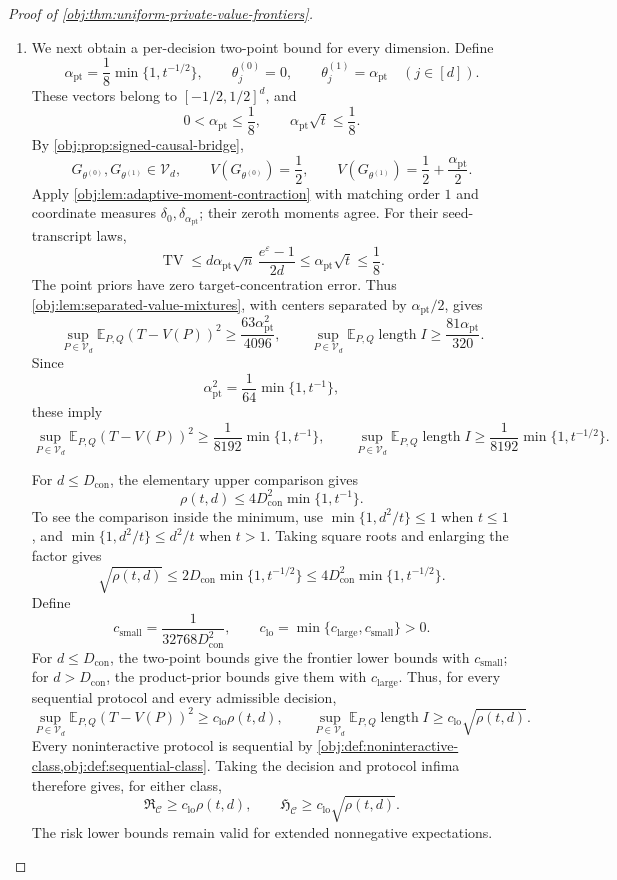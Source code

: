 \begin{proof}[Proof of \cref{obj:thm:uniform-private-value-frontiers}]
\begin{enumerate}
\item
We next obtain a per-decision two-point bound for every dimension. Define
\[
\alpha_{\mathrm{pt}}
=\frac18\min\{1,t^{-1/2}\},
\qquad
\theta^{(0)}_j=0,\qquad
\theta^{(1)}_j=\alpha_{\mathrm{pt}}
\quad(j\in[d]).
\]
These vectors belong to \([-1/2,1/2]^d\), and
\[
0<\alpha_{\mathrm{pt}}\le\frac18,\qquad
\alpha_{\mathrm{pt}}\sqrt t\le\frac18.
\]
By \cref{obj:prop:signed-causal-bridge},
\[
G_{\theta^{(0)}},G_{\theta^{(1)}}\in\mathcal V_d,
\qquad
V(G_{\theta^{(0)}})=\frac12,\qquad
V(G_{\theta^{(1)}})=\frac12+\frac{\alpha_{\mathrm{pt}}}{2}.
\]
Apply \cref{obj:lem:adaptive-moment-contraction} with matching order \(1\) and coordinate measures \(\delta_0,\delta_{\alpha_{\mathrm{pt}}}\); their zeroth moments agree. For their seed-transcript laws,
\[
\operatorname{TV}
\le d\alpha_{\mathrm{pt}}\sqrt n\,
       \frac{e^\varepsilon-1}{2d}
\le\alpha_{\mathrm{pt}}\sqrt t
\le\frac18.
\]
The point priors have zero target-concentration error. Thus \cref{obj:lem:separated-value-mixtures}, with centers separated by
\(\alpha_{\mathrm{pt}}/2\), gives
\[
\sup_{P\in\mathcal V_d}\mathbb E_{P,Q}(T-V(P))^2
\ge\frac{63\alpha_{\mathrm{pt}}^2}{4096},
\qquad
\sup_{P\in\mathcal V_d}\mathbb E_{P,Q}\operatorname{length}I
\ge\frac{81\alpha_{\mathrm{pt}}}{320}.
\]
Since
\[
\alpha_{\mathrm{pt}}^2=\frac1{64}\min\{1,t^{-1}\},
\]
these imply
\[
\sup_{P\in\mathcal V_d}\mathbb E_{P,Q}(T-V(P))^2
\ge\frac1{8192}\min\{1,t^{-1}\},
\qquad
\sup_{P\in\mathcal V_d}\mathbb E_{P,Q}\operatorname{length}I
\ge\frac1{8192}\min\{1,t^{-1/2}\}.
\]

For \(d\le D_{\mathrm{con}}\), the elementary upper comparison gives
\[
\rho(t,d)\le4D_{\mathrm{con}}^2\min\{1,t^{-1}\}.
\]
To see the comparison inside the minimum, use
\(\min\{1,d^2/t\}\le1\) when \(t\le1\), and
\(\min\{1,d^2/t\}\le d^2/t\) when \(t>1\).
Taking square roots and enlarging the factor gives
\[
\sqrt{\rho(t,d)}
\le2D_{\mathrm{con}}\min\{1,t^{-1/2}\}
\le4D_{\mathrm{con}}^2\min\{1,t^{-1/2}\}.
\]
Define
\[
c_{\mathrm{small}}=\frac1{32768D_{\mathrm{con}}^2},
\qquad
c_{\mathrm{lo}}=\min\{c_{\mathrm{large}},c_{\mathrm{small}}\}>0.
\]
For \(d\le D_{\mathrm{con}}\), the two-point bounds give the frontier lower bounds with \(c_{\mathrm{small}}\); for \(d>D_{\mathrm{con}}\), the product-prior bounds give them with \(c_{\mathrm{large}}\). Thus, for every sequential protocol and every admissible decision,
\[
\sup_{P\in\mathcal V_d}\mathbb E_{P,Q}(T-V(P))^2
\ge c_{\mathrm{lo}}\rho(t,d),
\qquad
\sup_{P\in\mathcal V_d}\mathbb E_{P,Q}\operatorname{length}I
\ge c_{\mathrm{lo}}\sqrt{\rho(t,d)}.
\]
Every noninteractive protocol is sequential by
\cref{obj:def:noninteractive-class,obj:def:sequential-class}.
Taking the decision and protocol infima therefore gives, for either class,
\[
\mathfrak R_{\mathcal C}\ge c_{\mathrm{lo}}\rho(t,d),
\qquad
\mathfrak H_{\mathcal C}\ge c_{\mathrm{lo}}\sqrt{\rho(t,d)}.
\]
The risk lower bounds remain valid for extended nonnegative expectations.


\end{enumerate}
\end{proof}
